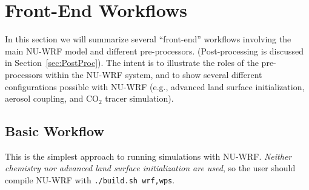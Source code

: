 \section{Front-End Workflows}
\label{sec:FrontWorkflows}

In this section we will summarize several ``front-end'' workflows involving
the main NU-WRF model and different pre-processors. (Post-processing is
discussed in Section~\ref{sec:PostProc}). The intent is to 
illustrate the roles of the pre-processors within the NU-WRF system, and to 
show several different configurations possible with NU-WRF (e.g., advanced
land surface initialization, aerosol coupling, and CO$_2$ tracer simulation).

\subsection{Basic Workflow}
\label{subsec:BasicWorkflow}

This is the simplest approach to running simulations with NU-WRF. 
\textit{Neither chemistry nor advanced land surface initialization are 
used}, so the user should compile NU-WRF with \texttt{./build.sh wrf,wps}.

